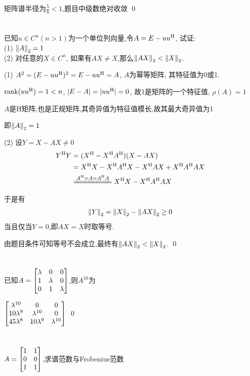 \documentclass{matrix-homework}
\begin{document}
矩阵谱半径为$\frac{5}{6}<1$,题目中级数绝对收敛
\qed

\newpage
\section{}
已知$u\in C^n(n>1)$为一个单位列向量,令$A=E-uu^{\mathrm{H}}$, 试证:\\(1) $\left\lVert A \right\rVert_2=1$\\(2) 对任意的$X\in C^n$, 如果有$AX\ne X$,那么$\left\lVert AX \right\rVert_2<\left\lVert X \right\rVert_2$.

\answer
(1) $A^2=(E-uu^{\mathrm{H}})^2=E-uu^{\mathrm{H}}=A$, $A$为幂等矩阵, 其特征值为0或1.

$\mathrm{rank}(uu^{\mathrm{H}})=1<n$, $|E-A|=|uu^{\mathrm{H}}|=0$, 故1是矩阵的一个特征值, $\rho(A)=1$

$A$是H矩阵,也是正规矩阵,其奇异值为特征值模长,故其最大奇异值为1

即$\left\lVert A \right\rVert_2=1$

(2) 设$Y=X-AX\ne0$
\begin{align*}
    Y^\HH Y & =(X^\HH-X^\HH A^\HH)(X-AX)                              \\
            & = X^\HH X - X^\HH A^\HH X - X^\HH AX+X^\HH A^\HH AX     \\
            & \xlongequal[]{A^\HH=A=A^\HH A} X^\HH X - X^\HH A^\HH AX
\end{align*}

于是有
\begin{align*}
    \left\lVert Y \right\rVert_2=\left\lVert X \right\rVert_2 - \left\lVert AX \right\rVert_2 \ge 0
\end{align*}
当且仅当$Y=0$,即$AX=X$时取等号.

由题目条件可知等号不会成立,最终有$\left\lVert AX \right\rVert_2<\left\lVert X \right\rVert_2$.
\qed


\section{}
已知$A=\begin{bmatrix}\lambda & 0 & 0 \\ 1 & \lambda & 0 \\ 0 & 1 & \lambda\end{bmatrix}$,则$A^{10}$为

\answer
$\begin{bmatrix}\lambda^{10} & 0 & 0 \\ 10\lambda^9 & \lambda^{10} & 0 \\ 45\lambda^8 & 10\lambda^9 & \lambda^{10}\end{bmatrix}$
\qed


\section{}
$A=\begin{bmatrix}1&1\\0&0\\1&1\end{bmatrix}$,求谱范数与Frobenius范数
\end{document}

